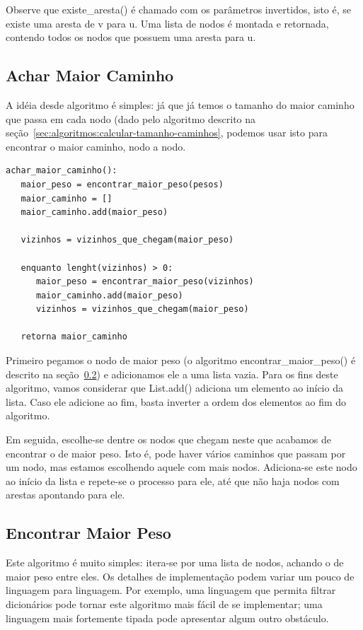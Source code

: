 \documentclass[12pt]{article}
\begin{document}
Observe que {\sf existe\_aresta()} é chamado com os parâmetros invertidos, isto é, se existe uma aresta de {\sf v} para {\sf u}.
Uma lista de nodos é montada e retornada, contendo todos os nodos que possuem uma aresta para {\sf u}.


\subsection{Achar Maior Caminho}\label{sec:algoritmos:achar-maior-caminho}
A idéia desde algoritmo é simples: já que já temos o tamanho do maior caminho que passa em cada nodo (dado pelo algoritmo descrito na se\c{c}ão~\ref{sec:algoritmos:calcular-tamanho-caminhos}, podemos usar isto para encontrar o maior caminho, nodo a nodo.

\begin{lstlisting}
achar_maior_caminho():
   maior_peso = encontrar_maior_peso(pesos)
   maior_caminho = []
   maior_caminho.add(maior_peso)

   vizinhos = vizinhos_que_chegam(maior_peso)

   enquanto lenght(vizinhos) > 0:
      maior_peso = encontrar_maior_peso(vizinhos)
      maior_caminho.add(maior_peso)
      vizinhos = vizinhos_que_chegam(maior_peso)

   retorna maior_caminho
\end{lstlisting}

Primeiro pegamos o nodo de maior peso (o algoritmo {\sf encontrar\_maior\_peso()} é descrito na se\c{c}ão~\ref{sec:algoritmos:encontrar-maior-peso}) e adicionamos ele a uma lista vazia. Para os fins deste algoritmo, vamos considerar que {\sf List.add()} adiciona um elemento ao início da lista. Caso ele adicione ao fim, basta inverter a ordem dos elementos ao fim do algoritmo.

Em seguida, escolhe-se dentre os nodos que chegam neste que acabamos de encontrar o de maior peso. Isto é, pode haver vários caminhos que passam por um nodo, mas estamos escolhendo aquele com mais nodos. Adiciona-se este nodo ao início da lista e repete-se o processo para ele, até que não haja nodos com arestas apontando para ele.


\subsection{Encontrar Maior Peso}\label{sec:algoritmos:encontrar-maior-peso}
Este algoritmo é muito simples: itera-se por uma lista de nodos, achando o de maior peso entre eles. Os detalhes de implementa\c{c}ão podem variar um pouco de linguagem para linguagem. Por exemplo, uma linguagem que permita filtrar dicionários pode tornar este algoritmo mais fácil de se implementar; uma linguagem mais fortemente tipada pode apresentar algum outro obstáculo.
\end{document}
